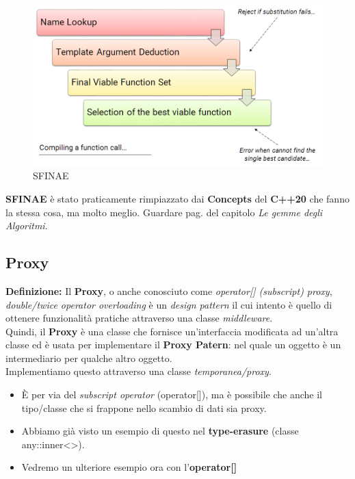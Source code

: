 \newpage %

\begin{figure}[H]
	\centering
	\includegraphics[width=1\textwidth, height=1\textheight, keepaspectratio]{./imgs/SFINAE.png}
	\caption{SFINAE}
	\label{fig:SFINAE}
\end{figure}

\textsf{\small \textbf{SFINAE} è stato praticamente rimpiazzato dai \textbf{Concepts} del \textbf{C++20} che fanno la stessa cosa, ma molto meglio. Guardare pag.\textbf{\pageref{concepts}} del capitolo \emph{Le gemme degli Algoritmi}.} \\ %

\subsection{Proxy}

\textsf{\small \textbf{Definizione: } Il \textbf{Proxy}, o anche conosciuto come \emph{operator[] (subscript) proxy}, \emph{double/twice operator overloading} è un \emph{design pattern} il cui intento è quello di ottenere funzionalità pratiche attraverso una classe \emph{middleware}.} \\

\textsf{\small Quindi, il \textbf{Proxy} è una classe che fornisce un'interfaccia modificata ad un'altra classe ed è usata per implementare il \textbf{Proxy Patern}: nel quale un oggetto è un intermediario per qualche altro oggetto.} \\

\textsf{\small Implementiamo questo attraverso una classe \emph{temporanea/proxy}.} \break

\begin{itemize}
	\item \textsf{\small È per via del \emph{subscript operator} (operator[]), ma è possibile che anche il tipo/classe che si frappone nello scambio di dati sia proxy. }
	\item \textsf{\small Abbiamo già visto un esempio di questo nel \textbf{type-erasure} (classe any::inner<>).}
	\item \textsf{\small Vedremo un ulteriore esempio ora con l'\textbf{operator[]}}
\end{itemize}

